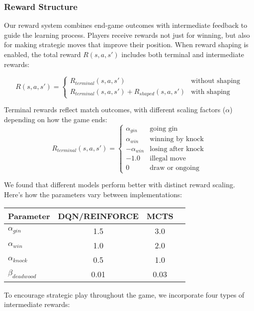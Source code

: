 
\subsubsection{Reward Structure}

Our reward system combines end-game outcomes with intermediate feedback to guide the learning process. Players receive rewards not just for winning, but also for making strategic moves that improve their position. When reward shaping is enabled, the total reward $R(s,a,s')$ includes both terminal and intermediate rewards:

\[
R(s,a,s') = \begin{cases}
R_{terminal}(s,a,s') & \text{without shaping} \\
R_{terminal}(s,a,s') + R_{shaped}(s,a,s') & \text{with shaping}
\end{cases}
\]

Terminal rewards reflect match outcomes, with different scaling factors ($\alpha$) depending on how the game ends:
\[
R_{terminal}(s,a,s') = \begin{cases}
\alpha_{gin} & \text{going gin} \\
\alpha_{win} & \text{winning by knock} \\
-\alpha_{win} & \text{losing after knock} \\
-1.0 & \text{illegal move} \\
0 & \text{draw or ongoing}
\end{cases}
\]

We found that different models perform better with distinct reward scaling. Here's how the parameters vary between implementations:

\begin{table}[h]
\centering
\begin{tabular}{lccc}
\hline
Parameter & DQN/REINFORCE & MCTS \\
\hline
$\alpha_{gin}$ & 1.5 & 3.0 \\
$\alpha_{win}$ & 1.0 & 2.0 \\
$\alpha_{knock}$ & 0.5 & 1.0 \\
$\beta_{deadwood}$ & 0.01 & 0.03 \\
\hline
\end{tabular}
\end{table}

To encourage strategic play throughout the game, we incorporate four types of intermediate rewards:

